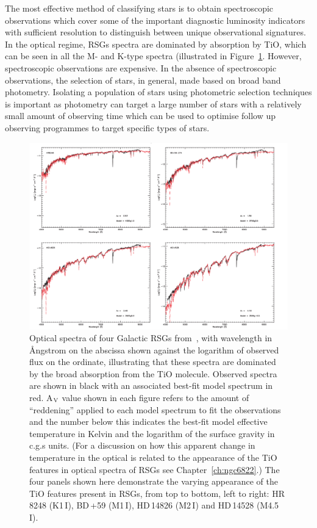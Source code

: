 The most effective method of classifying stars is to obtain spectroscopic observations which cover some of the important diagnostic luminosity indicators with sufficient resolution to distinguish between unique observational signatures.
In the optical regime, RSGs spectra are dominated by absorption by TiO, which can be seen in all the M- and K-type spectra (illustrated in Figure~\ref{fig:RSGoptical}.
However, spectroscopic observations are expensive.
In the absence of spectroscopic observations, the selection of stars, in general, made based on broad band photometry.
Isolating a population of stars using photometric selection techniques is important as photometry can target a large number of stars with a relatively small amount of observing time which can be used to optimise follow up observing programmes to target specific types of stars.

 \begin{figure}
 \centering
 \includegraphics[width=\textwidth]{intro/Levesque_Fig1}
 \caption[Optical spectra of four RSGs from~\citeauthor{Levesque05}]{Optical spectra of four Galactic RSGs from~\cite{Levesque05}, with wavelength in \AA ngstrom on the abscissa shown against the logarithm of observed flux on the ordinate, illustrating that these spectra are dominated by the broad absorption from the TiO molecule.
 Observed spectra are shown in black with an associated best-fit model spectrum in red.
 A$_{\rm V}$ value shown in each figure refers to the amount of ``reddening'' applied to each model spectrum to fit the observations and the number below this indicates the best-fit model effective temperature in Kelvin and the logarithm of the surface gravity in c.g.s units. (For a discussion on how this apparent change in temperature in the optical is related to the appearance of the TiO features in optical spectra of RSGs see Chapter~\ref{ch:ngc6822}.)
 The four panels shown here demonstrate the varying appearance of the TiO features present in RSGs, from top to bottom, left to right:
 HR\,8248 (K1\,I),
 BD\,+59 (M1\,I),
 HD\,14826 (M2\,I) and
 HD\,14528 (M4.5\,I).
 \label{fig:RSGoptical}}
\end{figure}

